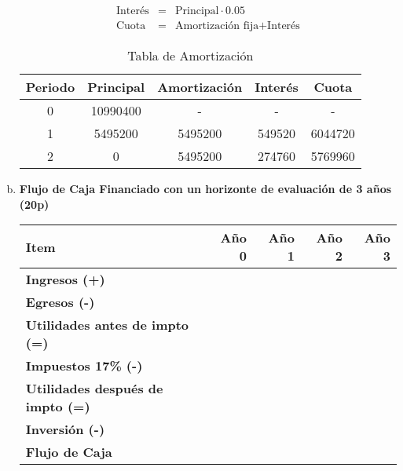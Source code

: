 \begin{enumerate}[(a)]
        \begin{eqnarray}
            \text{Interés} &=& \text{Principal}\cdot 0.05 \\
            \text{Cuota}   &=& \text{Amortización fija} + \text{Interés} 
        \end{eqnarray}

        \begin{table}[h!t]
            \centering
            \begin{tabular}{|c|c|c|c|c|}
                \hline
                {\bf Periodo} & {\bf Principal }   & {\bf Amortización} & {\bf Interés} & {\bf Cuota} \\\hline
                0             & 10990400           &        -           & -                  & -      \\\hline
                1             & 5495200            &  5495200           & 549520             & 6044720\\\hline
                2             & 0                  &  5495200           & 274760             & 5769960\\\hline
            \end{tabular}
            \caption{Tabla de Amortización}
            \label{tab:amortizacion}          
        \end{table}




\newpage
    \item {\bf Flujo de Caja Financiado con un horizonte de evaluación de 3 años (20p)}


            \begin{table}[h!t]
                \begin{tabular}{|l|r|r|r|r|}
                    \hline
                    {\bf Item}                            & {\bf Año 0} & {\bf Año 1 } & {\bf Año 2} & {\bf Año 3} \\ \hline
                    {\bf Ingresos (+)}                    &             &              &             & \\\hline
                    {\bf Egresos (-)}                     &             &              &             & \\\hline
                    {\bf Utilidades antes de impto (=)}   &             &              &             & \\\hline
                    {\bf Impuestos 17\% (-)}              &             &              &             & \\\hline
                    {\bf Utilidades después de impto (=)} &             &              &             & \\\hline
                    {\bf Inversión (-)}                   &             &              &             & \\\hline
                    {\bf Flujo de Caja }                  &             &              &             & \\\hline
                    

\end{tabular}
\end{table}
\end{enumerate}
